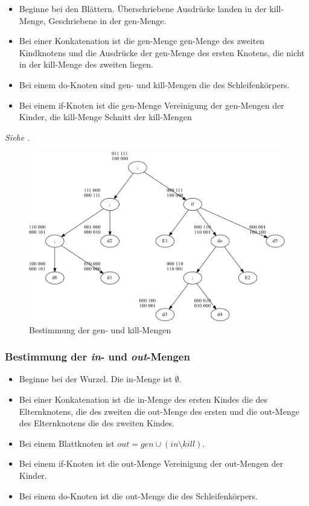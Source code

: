 \begin{itemize}
    \item Beginne bei den Blättern. Überschriebene Ausdrücke landen in der kill-Menge,
        Geschriebene in der gen-Menge.
    \item Bei einer Konkatenation ist die gen-Menge gen-Menge des zweiten Kindknotens
        und die Ausdrücke der gen-Menge des ersten Knotens, die nicht in der kill-Menge
        des zweiten liegen.
    \item Bei einem do-Knoten sind gen- und kill-Mengen die des Schleifenkörpers.
    \item Bei einem if-Knoten ist die gen-Menge Vereinigung der gen-Mengen der Kinder,
        die kill-Menge Schnitt der kill-Mengen
\end{itemize}
\textit{Siehe .}
\begin{figure}[p]
    \centering
    \includegraphics[scale=0.4]{images/convent-genkill.pdf}
    \caption{Bestimmung der gen- und kill-Mengen}
    \label{convent:genkill}
\end{figure}

\subsubsection{Bestimmung der \textit{in}- und \textit{out}-Mengen}

\begin{itemize}
    \item Beginne bei der Wurzel. Die in-Menge ist $\emptyset$.
    \item Bei einer Konkatenation ist die in-Menge des ersten Kindes die des Elternknotens,
        die des zweiten die out-Menge des ersten und die out-Menge des Elternknotens die des
        zweiten Kindes.
    \item Bei einem Blattknoten ist $out = gen \cup (in \setminus kill)$.
    \item Bei einem if-Knoten ist die out-Menge Vereinigung der out-Mengen der Kinder.
    \item Bei einem do-Knoten ist die out-Menge die des Schleifenkörpers.
\end{itemize}

